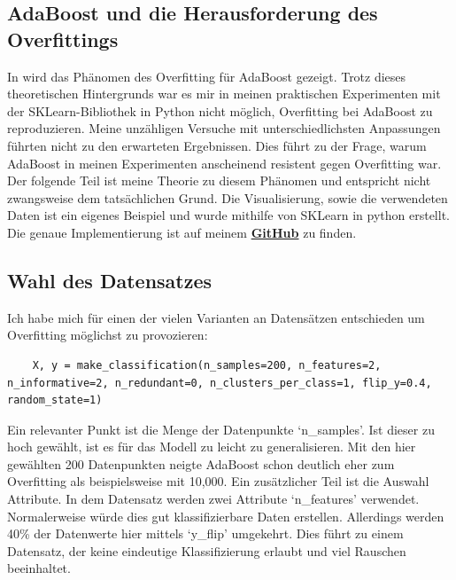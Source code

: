 \subsection{AdaBoost und die Herausforderung des Overfittings}
In \textcite[Kapitel 1.2.3]{SchapireFreund2012} wird das Phänomen des Overfitting für AdaBoost gezeigt. Trotz dieses theoretischen Hintergrunds war es mir in meinen praktischen Experimenten mit der SKLearn-Bibliothek in Python nicht möglich, Overfitting bei AdaBoost zu reproduzieren. Meine unzähligen Versuche mit unterschiedlichsten Anpassungen führten nicht zu den erwarteten Ergebnissen. Dies führt zu der Frage, warum AdaBoost in meinen Experimenten anscheinend resistent gegen Overfitting war. Der folgende Teil ist meine Theorie zu diesem Phänomen und entspricht nicht zwangsweise dem tatsächlichen Grund. Die Visualisierung, sowie die verwendeten Daten ist ein eigenes Beispiel und wurde mithilfe von SKLearn in python erstellt. Die genaue Implementierung ist auf meinem \textbf{\href{https://github.com/CodeLtDave/Boosting-Algorithms-ML-Seminararbeit/blob/main/python-env/ToleranceOverfittingAdaBoost.ipynb}{GitHub}} zu finden.

\subsection{Wahl des Datensatzes}

Ich habe mich für einen der vielen Varianten an Datensätzen entschieden um Overfitting möglichst zu provozieren:

\begin{lstlisting}
    X, y = make_classification(n_samples=200, n_features=2, n_informative=2, n_redundant=0, n_clusters_per_class=1, flip_y=0.4, random_state=1)
\end{lstlisting}    
Ein relevanter Punkt ist die Menge der Datenpunkte `n\_samples'. Ist dieser zu hoch 
gewählt, ist es für das Modell zu leicht zu generalisieren. Mit den hier gewählten 200 Datenpunkten neigte AdaBoost schon deutlich eher zum Overfitting als beispielsweise mit 10,000.
\newline
Ein zusätzlicher Teil ist die Auswahl Attribute. In dem Datensatz werden zwei Attribute `n\_features' verwendet. Normalerweise würde dies gut klassifizierbare Daten erstellen. Allerdings werden 40\% der Datenwerte hier mittels `y\_flip' umgekehrt. Dies führt zu einem Datensatz, der keine eindeutige Klassifizierung erlaubt und viel Rauschen beeinhaltet.

